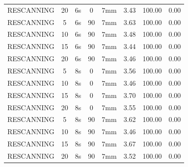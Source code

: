 \documentclass[type=dr, dr=rernat, accentcolor=tud7b,colorbacktitle, bigchapter, openright, twoside, 12pt ]{tudthesis}
\begin{document}
\begin{table}[H]
\begin{tabular}{|c|c||c|c|c||c|c|c|}
RESCANNING & 20 & 6s & 0 & 7mm & 3.43 & 100.00 & 0.00 \\
RESCANNING & 5 & 6s & 90 & 7mm & 3.63 & 100.00 & 0.00 \\
RESCANNING & 10 & 6s & 90 & 7mm & 3.48 & 100.00 & 0.00 \\
RESCANNING & 15 & 6s & 90 & 7mm & 3.44 & 100.00 & 0.00 \\
RESCANNING & 20 & 6s & 90 & 7mm & 3.46 & 100.00 & 0.00 \\
RESCANNING & 5 & 8s & 0 & 7mm & 3.56 & 100.00 & 0.00 \\
RESCANNING & 10 & 8s & 0 & 7mm & 3.46 & 100.00 & 0.00 \\
RESCANNING & 15 & 8s & 0 & 7mm & 3.70 & 100.00 & 0.00 \\
RESCANNING & 20 & 8s & 0 & 7mm & 3.55 & 100.00 & 0.00 \\
RESCANNING & 5 & 8s & 90 & 7mm & 3.62 & 100.00 & 0.00 \\
RESCANNING & 10 & 8s & 90 & 7mm & 3.46 & 100.00 & 0.00 \\
RESCANNING & 15 & 8s & 90 & 7mm & 3.67 & 100.00 & 0.00 \\
RESCANNING & 20 & 8s & 90 & 7mm & 3.52 & 100.00 & 0.00 \\
    \hline\hline 
  \end{tabular}
\end{table}

\newpage
\end{document}
